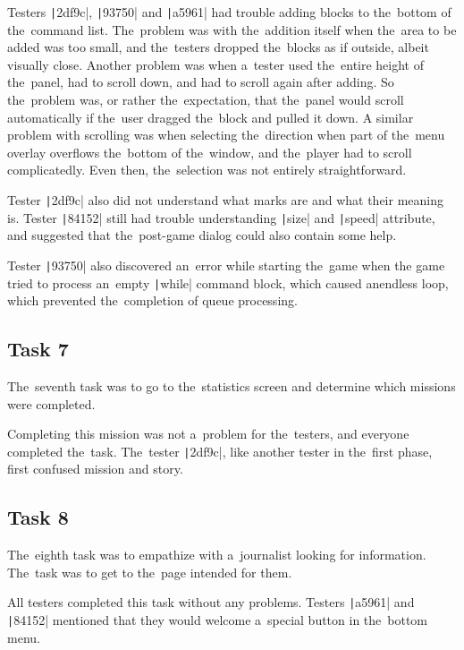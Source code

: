 Testers \texttt|2df9c|, \texttt|93750| and \texttt|a5961| had trouble adding blocks to the~bottom of the~command list.
The~problem was with the~addition itself when the~area to be added was too small, and the~testers dropped the~blocks as if outside, albeit visually close.
Another problem was when a~tester used the~entire height of the~panel, had to scroll down, and had to scroll again after adding.
So the~problem was, or rather the~expectation, that the~panel would scroll automatically if the~user dragged the~block and pulled it down.
A similar problem with scrolling was when selecting the~direction when part of the~menu overlay overflows the~bottom of the~window, and the~player had to scroll complicatedly. Even then, the~selection was not entirely straightforward.

Tester \texttt|2df9c| also did not understand what marks are and what their meaning is.
Tester \texttt|84152| still had trouble understanding \texttt|size| and \texttt|speed| attribute, and suggested that the~post-game dialog could also contain some help.

Tester \texttt|93750| also discovered an~error while starting the~game when the game tried to process an~empty \texttt|while| command block, which caused an\linebreak{}endless loop, which prevented the~completion of queue processing.

\subsection*{Task 7}

The~seventh task was to go to the~statistics screen and determine which missions were completed.

Completing this mission was not a~problem for the~testers, and everyone completed the~task.
The~tester \texttt|2df9c|, like another tester in the~first phase, first confused mission and story.

\subsection*{Task 8}

The~eighth task was to empathize with a~journalist looking for information.
The~task was to get to the~page intended for them.

All testers completed this task without any problems.
Testers \texttt|a5961| and \texttt|84152| mentioned that they would welcome a~special button in the~bottom menu.

